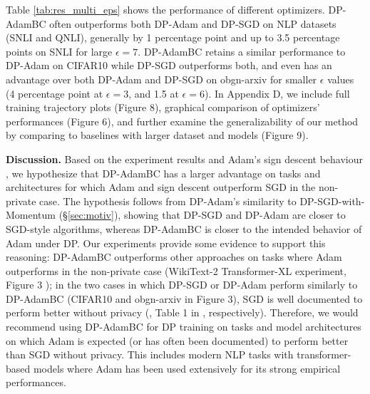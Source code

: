 \documentclass[letterpaper]{article} %
\begin{document}
Table \ref{tab:res_multi_eps} shows the performance of different optimizers. DP-AdamBC often outperforms both DP-Adam and DP-SGD on NLP datasets (SNLI and QNLI), generally by 1 percentage point and up to 3.5 percentage points on SNLI for large $\epsilon=7$. DP-AdamBC retains a similar performance to DP-Adam on CIFAR10 while DP-SGD outperforms both, and even has an advantage over both DP-Adam and DP-SGD on obgn-arxiv for smaller $\epsilon$ values (4 percentage point at $\epsilon=3$, and 1.5 at $\epsilon=6$).
%
In Appendix D, we include full training trajectory plots (Figure 8), graphical comparison of optimizers' performances (Figure 6), and further examine the generalizability of our method by comparing to baselines with larger dataset and models (Figure 9).

{\bf Discussion.} Based on the experiment results and Adam's sign descent behaviour \citep{kunstner2023heavytailed}, we hypothesize that DP-AdamBC has a larger advantage on tasks and architectures for which Adam and sign descent outperform SGD in the non-private case. The hypothesis follows from DP-Adam's similarity to DP-SGD-with-Momentum (\S\ref{sec:motiv}), showing that DP-SGD and DP-Adam are closer to SGD-style algorithms, whereas DP-AdamBC is closer to the intended behavior of Adam under DP. Our experiments provide some evidence to support this reasoning: DP-AdamBC outperforms other approaches on tasks where Adam outperforms in the non-private case (WikiText-2 Transformer-XL experiment, Figure 3 \citet{kunstner2023heavytailed}); in the two cases in which DP-SGD or DP-Adam perform similarly to DP-AdamBC (CIFAR10 and obgn-arxiv in Figure 3), SGD is well documented to perform better without privacy (\citet{wilson2018marginal}, Table 1 in \citet{daigavane2022nodelevel}, respectively). Therefore, we would recommend using DP-AdamBC for DP training on tasks and model architectures on which Adam is expected (or has often been documented) to perform better than SGD without privacy. This includes modern NLP tasks with transformer-based models where Adam has been used extensively for its strong empirical performances.
\end{document}
